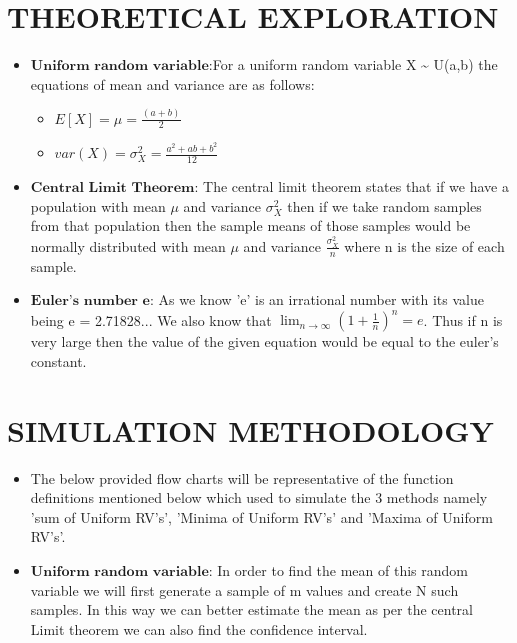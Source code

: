 \documentclass[11pt]{article}
\providecommand{\tightlist}{%
      \setlength{\itemsep}{0pt}\setlength{\parskip}{0pt}}
\begin{document}
    \section{THEORETICAL EXPLORATION}\label{theoretical-exploration}

\begin{itemize}
\item
  \(\textbf{Uniform random variable}\):For a uniform random variable X
  \textasciitilde{} U(a,b) the equations of mean and variance are as
  follows:

  \begin{itemize}
  \item
    \(E[X] = \mu = \frac{(a+b)}{2}\)
  \item
    \(var(X) = \sigma_X^2 = \frac{a^2+ab+b^2}{12}\)
  \end{itemize}
\item
  \(\textbf{Central Limit Theorem}\): The central limit theorem states
  that if we have a population with mean \(\mu\) and variance
  \(\sigma_X^2\) then if we take random samples from that population
  then the sample means of those samples would be normally distributed
  with mean \(\mu\) and variance \(\frac{\sigma_X^2}{n}\) where n is the
  size of each sample.
\item
  \(\textbf{Euler's number e}\): As we know 'e' is an irrational number
  with its value being e = 2.71828... We also know that
  \(\lim_{n\to\infty} (1+\frac{1}{n})^n = e\). Thus if n is very large
  then the value of the given equation would be equal to the euler's
  constant.
\end{itemize}

    \section{SIMULATION METHODOLOGY}\label{simulation-methodology}

    \begin{itemize}
\tightlist
\item
  The below provided flow charts will be representative of the function
  definitions mentioned below which used to simulate the 3 methods
  namely 'sum of Uniform RV's', 'Minima of Uniform RV's' and 'Maxima of
  Uniform RV's'.
\end{itemize}

    \begin{itemize}
\tightlist
\item
  \(\textbf{Uniform random variable}\): In order to find the mean of
  this random variable we will first generate a sample of m values and
  create N such samples. In this way we can better estimate the mean as
  per the central Limit theorem we can also find the confidence
  interval.
\end{itemize}
\end{document}
